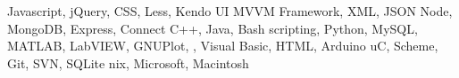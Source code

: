 
\citembullet Javascript, jQuery, CSS, Less, Kendo UI MVVM Framework, XML, JSON
\citembullet Node, MongoDB, Express, Connect
\citembullet C++, Java, Bash scripting,  Python, MySQL, MATLAB, LabVIEW, GNUPlot, \LaTeXe, Visual Basic, HTML, Arduino uC, Scheme, Git, SVN, SQLite
\citembullet *nix, Microsoft, Macintosh

